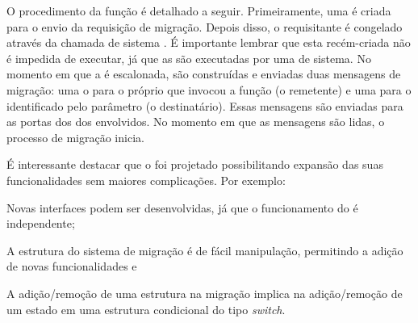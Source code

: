 O procedimento da função \kmigrateto é detalhado a seguir. Primeiramente, uma \task é criada para o envio da requisição de migração. Depois disso, o \cluster requisitante é congelado através da chamada de sistema \freeze. É importante lembrar que esta \task recém-criada não é impedida de executar, já que as \tasks são executadas por uma \thread de sistema. No momento em que a \task é escalonada, são construídas e enviadas duas mensagens de migração: uma o para o próprio \cluster que invocou a função \kmigrateto (o remetente) e uma para o \cluster identificado pelo parâmetro (o destinatário). Essas mensagens são enviadas para as portas \mailbox dos \daemons dos \clusters envolvidos. No momento em que as mensagens são lidas, o processo de migração inicia.

É interessante destacar que o \daemon foi projetado possibilitando expansão das suas funcionalidades sem maiores complicações. Por exemplo:
\begin{inlinelist}
    \item Novas interfaces podem ser desenvolvidas, já que o funcionamento do \daemon é independente;
    \item A estrutura do sistema de migração é de fácil manipulação, permitindo a adição de novas funcionalidades e
    \item A adição/remoção de uma estrutura na migração implica na adição/remoção de um estado em uma estrutura condicional do tipo \textit{switch}.
\end{inlinelist}

